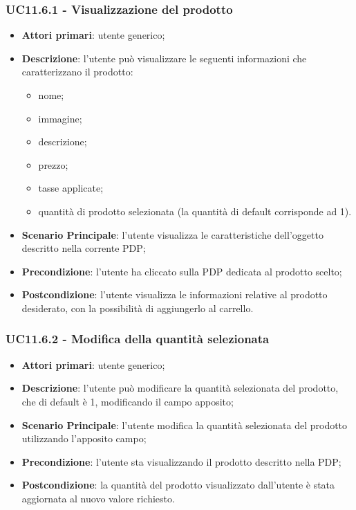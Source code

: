 \subsubsection{UC11.6.1 - Visualizzazione del prodotto}
\begin{itemize}
\item \textbf{Attori primari}: utente generico;
\item \textbf{Descrizione}: l'utente può visualizzare le seguenti informazioni che caratterizzano il prodotto:
\begin{itemize}
\item nome;
\item immagine;
\item descrizione;
\item prezzo;
\item tasse applicate;
\item quantità di prodotto selezionata (la quantità di default corrisponde ad 1).
\end{itemize}
\item \textbf{Scenario Principale}: l'utente visualizza le caratteristiche dell'oggetto descritto nella corrente PDP;
\item \textbf{Precondizione}: l'utente ha cliccato sulla PDP dedicata al prodotto scelto;
\item \textbf{Postcondizione}: l'utente visualizza le informazioni relative al prodotto desiderato, con la possibilità di aggiungerlo al carrello.
\end{itemize}
\subsubsection{UC11.6.2 - Modifica della quantità selezionata}
\begin{itemize}
\item \textbf{Attori primari}: utente generico;
\item \textbf{Descrizione}: l'utente può modificare la quantità selezionata del prodotto, che di default è 1, modificando il campo apposito;
\item \textbf{Scenario Principale}: l'utente modifica la quantità selezionata del prodotto utilizzando l'apposito campo;
\item \textbf{Precondizione}: l'utente sta visualizzando il prodotto descritto nella PDP;
\item \textbf{Postcondizione}: la quantità del prodotto visualizzato dall'utente è stata aggiornata al nuovo valore richiesto.
\end{itemize}

